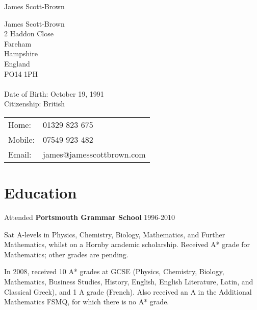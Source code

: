 \documentclass[letterpaper]{article}
\def\name{James Scott-Brown}
\renewenvironment{itemize}{
  \begin{list}{}{
    \setlength{\leftmargin}{1.5em}
  }
}{
  \end{list}
}
\begin{document}
{\huge \name}


\vspace{0.25in}

\begin{minipage}[t]{0.5\textwidth}
James Scott-Brown\\
2 Haddon Close\\
Fareham\\
Hampshire\\
England\\
PO14 1PH\\ \\
Date of Birth: October 19, 1991 \\
Citizenship: British
\end{minipage}
\begin{minipage}[t]{0.5\textwidth}
\begin{tabular}{ll}  
Home: &01329 823 675 \\
Mobile: &07549 923 482\\
Email: &james@jamesscottbrown.com \\
\end{tabular}
\end{minipage}



\section*{Education}
\begin{itemize}
 \item Attended {\bf Portsmouth Grammar School} 1996-2010
 \item Sat A-levels in Physics, Chemistry, Biology, Mathematics, and Further Mathematics, whilst on a Hornby academic scholarship. Received A* grade for Mathematics; other grades are pending.
 \item In 2008, received 10 A* grades at GCSE (Physics, Chemistry, Biology, Mathematics, Business Studies, History, English, English Literature, Latin, and Classical Greek), and 1 A grade (French). Also received an A in the Additional Mathematics FSMQ, for which there is no A* grade.
\end{itemize}
\end{document}

